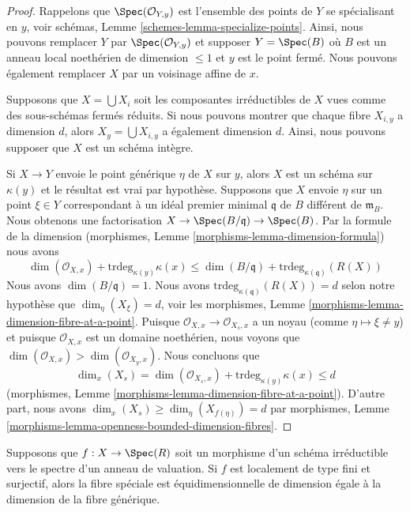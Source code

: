 \begin{proof}
Rappelons que $\Spec(\mathcal{O}_{Y, y})$ est l'ensemble
des points de $Y$ se spécialisant en $y$, voir schémas,
Lemme \ref{schemes-lemma-specialize-points}. Ainsi, nous
pouvons remplacer $Y$ par $\Spec(\mathcal{O}_{Y, y})$ et
supposer $Y = \Spec(B)$ où $B$ est un anneau local
noethérien de dimension $\leq 1$ et $y$ est le point fermé. Nous
pouvons également remplacer $X$ par un voisinage affine de $x$.

\medskip\noindent
Supposons que $X = \bigcup X_i$ soit les composantes irréductibles de $X$
vues comme des sous-schémas fermés réduits. Si nous pouvons montrer que
chaque fibre $X_{i, y}$ a dimension $d$, alors $X_y = \bigcup X_{i, y}$ a
également dimension $d$. Ainsi, nous pouvons supposer que $X$ est un schéma intègre.

\medskip\noindent
Si $X \to Y$ envoie le point générique $\eta$ de $X$ sur
$y$, alors $X$ est un schéma sur $\kappa(y)$ et le
résultat est vrai par hypothèse. Supposons que $X$ envoie
$\eta$ sur un point $\xi \in Y$ correspondant à un idéal
premier minimal $\mathfrak q$ de $B$ différent de $\mathfrak
m_B$. Nous obtenons une factorisation $X \to
\Spec(B/\mathfrak q) \to \Spec(B)$. Par la formule de la dimension
(morphismes, Lemme \ref{morphisms-lemma-dimension-formula}) nous avons
$$
\dim(\mathcal{O}_{X, x}) + \text{trdeg}_{\kappa(y)} \kappa(x) \leq
\dim(B/\mathfrak q) + \text{trdeg}_{\kappa(\mathfrak q)}(R(X))
$$
Nous avons $\dim(B/\mathfrak q) = 1$. Nous avons
$\text{trdeg}_{\kappa(\mathfrak q)}(R(X)) = d$ selon
notre hypothèse que $\dim_\eta(X_\xi) = d$, voir les
morphismes, Lemme
\ref{morphisms-lemma-dimension-fibre-at-a-point}. Puisque
$\mathcal{O}_{X, x} \to \mathcal{O}_{X_s, x}$ a un noyau
(comme $\eta \mapsto \xi \not = y$) et puisque
$\mathcal{O}_{X, x}$ est un domaine noethérien, nous voyons que
$\dim(\mathcal{O}_{X, x}) > \dim(\mathcal{O}_{X_y, x})$. Nous concluons que
$$
\dim_x(X_s) =
\dim(\mathcal{O}_{X_s, x}) + \text{trdeg}_{\kappa(y)} \kappa(x) \leq d
$$
(morphismes, Lemme
\ref{morphisms-lemma-dimension-fibre-at-a-point}). D'autre part,
nous avons $\dim_x(X_s) \geq \dim_\eta(X_{f(\eta)}) = d$ par
morphismes, Lemme \ref{morphisms-lemma-openness-bounded-dimension-fibres}.
\end{proof}

\begin{lemma}
\label{lemma-dominate-valuation-ring-dimension-fibres}
Supposons que $f : X \to \Spec(R)$ soit un morphisme d'un schéma
irréductible vers le spectre d'un anneau de valuation. Si $f$ est
localement de type fini et surjectif, alors la fibre spéciale est
équidimensionnelle de dimension égale à la dimension de la fibre générique.
\end{lemma}

